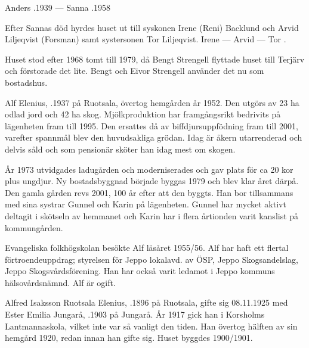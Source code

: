 Anders .1939  ---  Sanna .1958

Efter Sannas död hyrdes huset ut till syskonen Irene (Reni) Backlund och Arvid Liljeqvist (Forsman) samt systersonen Tor Liljeqvist. Irene	  ---  Arvid   ---  Tor	.

Huset stod efter 1968 tomt till 1979, då Bengt Strengell flyttade huset till Terjärv och förstorade det lite. Bengt och Eivor Strengell använder det nu som bostadshus.






Alf Elenius, .1937 på Ruotsala, övertog hemgården år 1952. Den utgörs av 23 ha odlad jord och 42 ha skog. Mjölkproduktion har framgångsrikt bedrivits på lägenheten fram till 1995. Den ersattes då av biffdjursuppfödning fram till 2001, varefter spannmål blev den huvudsakliga grödan. Idag är åkern utarrenderad och delvis såld och som pensionär  sköter han idag mest om skogen.

År 1973 utvidgades ladugården och moderniserades och gav plats för ca 20 kor plus ungdjur. Ny bostadsbyggnad började byggas 1979 och blev klar året därpå. Den gamla gården revs 2001, 100 år efter att den byggts. Han bor tillsammans med sina systrar Gunnel och Karin på lägenheten. Gunnel har mycket aktivt deltagit i skötseln av hemmanet och Karin har i flera årtionden varit kanslist på kommungården.

Evangeliska folkhögskolan besökte Alf läsåret 1955/56. Alf har haft ett flertal förtroendeuppdrag; styrelsen för Jeppo lokalavd. av ÖSP, Jeppo Skogsandelslag, Jeppo Skogsvårdsförening. Han har också varit ledamot i Jeppo kommuns hälsovårdsnämnd. Alf är ogift.






Alfred Isaksson Ruotsala Elenius, .1896 på Ruotsala, gifte sig 08.11.1925 med Ester Emilia Jungarå, .1903 på Jungarå. År 1917 gick han i Korsholms Lantmannaskola, vilket inte var så vanligt den tiden. Han övertog hälften av sin hemgård 1920, redan innan han gifte sig. Huset byggdes 1900/1901.

